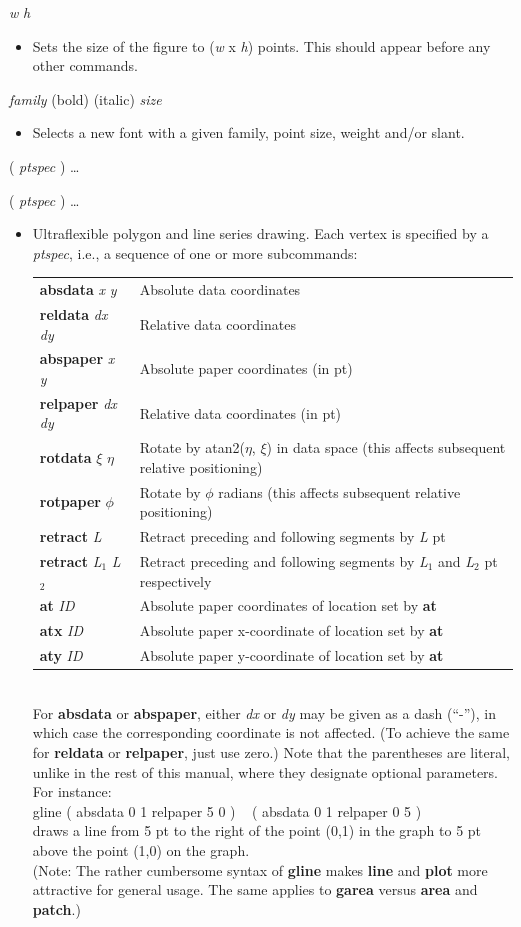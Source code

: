 \documentclass[11pt]{article}
\def\cmd#1#2{\noindent {\bf #1} #2\par}
\def\expl#1{\kern-8pt\begin{itemize}\item[]#1\end{itemize}}
\def\cref#1{{\bf #1}}
\begin{document}
\cmd{figsize}{\emph{w} \emph{h}}
\expl{Sets the size of the figure to (\emph{w} x \emph{h})
  points. This should appear before any other commands.}

\cmd{font}{\emph{family} (bold) (italic) \emph{size}}
\expl{Selects a new font with a given family, point size, weight
  and/or slant.}

\cmd{garea}{( \emph{ptspec} ) \ldots}
\cmd{gline}{( \emph{ptspec} ) \ldots}
\expl{Ultraflexible polygon and line series drawing. 
  Each vertex is specified by a \emph{ptspec}, i.e., a sequence of one or
  more subcommands:\medskip\\
\mbox{}\kern10pt\begin{tabular}{lp{3.8in}}
{\bf absdata} \emph{x} \emph{y} & Absolute data coordinates \\
{\bf reldata} \emph{dx} \emph{dy} & Relative data coordinates \\
{\bf abspaper} \emph{x} \emph{y} & Absolute paper coordinates (in pt)\\
{\bf relpaper} \emph{dx} \emph{dy} & Relative data coordinates (in
               pt)\\
{\bf rotdata} $\xi$ $\eta$ & Rotate by atan2($\eta$, $\xi$) 
              in data space (this affects subsequent relative
              positioning) \\
{\bf rotpaper} $\phi$ & Rotate by $\phi$ radians (this affects
subsequent relative positioning) \\
{\bf retract} \emph{L} & Retract preceding and following segments by
              \emph{L} pt \\
{\bf retract} \emph{L$_1$} \emph{L$_2$} & Retract preceding and following
              segments by \emph{L$_1$} and \emph{L$_2$} pt
              respectively \\
{\bf at} \emph{ID} & Absolute paper coordinates of location set by \cref{at} \\              
{\bf atx} \emph{ID} & Absolute paper x-coordinate of location set by \cref{at} \\              
{\bf aty} \emph{ID} & Absolute paper y-coordinate of location set by \cref{at} \\              
\end{tabular}\medskip\\
For {\bf absdata} or {\bf abspaper}, either \emph{dx} or \emph{dy} may
be given as a dash (``-''), in which case the corresponding coordinate
is not affected. (To achieve the same for {\bf reldata} or {\bf
  relpaper}, just use zero.)
Note that the parentheses are literal, unlike in the rest of this manual, where
they designate optional parameters. For instance:\medskip\\
\mbox{}\kern15pt
       gline ( absdata 0 1 relpaper 5 0 ) ~ ( absdata 0 1 relpaper 0 5 )
\medskip\\
     draws a line from 5 pt to the right of the point (0,1) in the graph to
     5 pt above the point (1,0) on the graph.\\
(Note: The rather cumbersome syntax of \cref{gline} makes \cref{line}
     and \cref{plot} more attractive for general usage. The same
     applies to \cref{garea} versus \cref{area} and \cref{patch}.)
}
\end{document}
